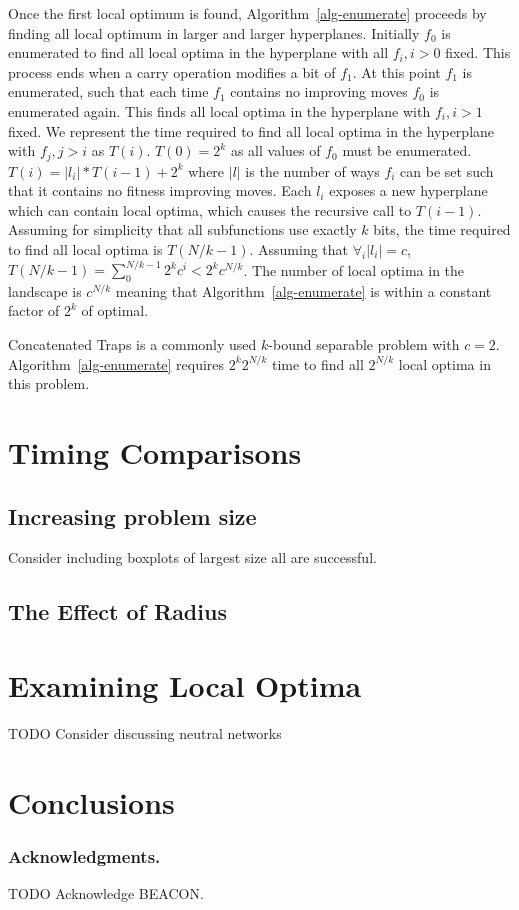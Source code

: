 \documentclass[runningheads,a4paper]{llncs}
\begin{document}
Once the first local optimum is found, Algorithm~\ref{alg-enumerate} proceeds
by finding all local optimum in larger and larger hyperplanes. Initially $f_0$
is enumerated to find all local optima in the hyperplane with all $f_i, i>0$
fixed. This process ends when a carry operation modifies a bit of $f_1$. At
this point $f_1$ is enumerated, such that each time $f_1$ contains no improving moves
$f_0$ is enumerated again. This finds all local optima in the hyperplane with $f_i, i>1$
fixed. We represent the time required to find all local optima in the hyperplane
with $f_j, j>i$ as $T(i)$. $T(0)=2^k$ as all values of $f_0$ must be enumerated.
$T(i) = |l_i|*T(i-1)+2^k$ where $|l|$ is the number of ways $f_i$ can be set such
that it contains no fitness improving moves. Each $l_i$ exposes a new hyperplane
which can contain local optima, which causes the recursive call to $T(i-1)$.
Assuming for simplicity that all subfunctions use exactly $k$ bits,
the time required to find all local optima is $T(N/k-1)$.
Assuming that $\forall_i |l_i|=c$, $T(N/k-1)=\sum_0^{N/k-1}2^kc^i<2^kc^{N/k}$.
The number of local optima in the landscape is $c^{N/k}$ meaning that Algorithm~\ref{alg-enumerate}
is within a constant factor of $2^k$ of optimal.

Concatenated Traps is a commonly used $k$-bound separable problem
with $c=2$.  Algorithm~\ref{alg-enumerate} requires $2^k2^{N/k}$ time
to find all $2^{N/k}$ local optima in this problem.

\section{Timing Comparisons}
\subsection{Increasing problem size}
Consider including boxplots of largest size all are successful.

\subsection{The Effect of Radius}

\section{Examining Local Optima}

TODO Consider discussing neutral networks

\section{Conclusions}

\subsubsection*{Acknowledgments.} TODO Acknowledge BEACON.



\end{document}
